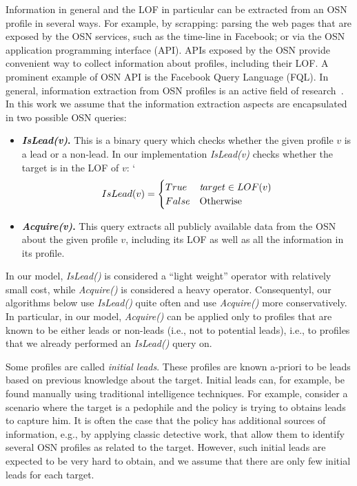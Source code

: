 \documentclass[prodmode,acmtecs]{acmsmall} %
\newcommand{\islead}[1]{{\em IsLead(#1)}}
\newcommand{\acquire}[1]{{\em Acquire(#1)}}
\newcommand{\target}{{\textit target}}
\begin{document}
Information in general and the LOF in particular can be extracted from an OSN profile in several ways. For example, by scrapping: parsing the web pages that are exposed by the OSN services, such as the time-line in Facebook; or via the OSN application programming interface (API). APIs exposed by the OSN provide convenient way to collect information about profiles, including their LOF. A prominent example of OSN API is the Facebook Query Language (FQL). 	
In general, information extraction from OSN profiles is an active field of research~\cite[inter alia]{tang2010aCombinationApproach,pawlas2012universal}.
In this work we assume that the information extraction aspects are encapsulated in two possible OSN queries: 
\begin{itemize}
\item {\bf \islead{v}.} This is a binary query which checks whether the given profile \(v\) is a lead or a non-lead. In our implementation \islead{v}  checks whether the target is in the LOF of $v$:
`
\begin{equation}
IsLead(v)=
\begin{cases} 
      True  & \target \in LOF(v) \\
      False & \text{Otherwise}
\end{cases}
\end{equation}
\item {\bf \acquire{v}.}  This query extracts all publicly available data from the OSN about the given profile \(v\), including its LOF as well as all the information in its profile.  
\end{itemize}

In our model, \islead{} is considered a ``light weight'' operator with relatively small cost, while \acquire{} is considered a heavy operator. 
Consequentyl, our algorithms below use \islead{} 
quite often and use \acquire{} more conservatively. In particular, in our model, \acquire{} can be applied only to profiles that are known to be either leads or non-leads (i.e., not to potential leads), i.e., to profiles that we already performed an \islead{} query on. 


Some profiles are called {\em initial leads}. These profiles are known a-priori to be leads based on previous knowledge about the target.  Initial leads can, for example, be found manually using traditional intelligence techniques. 
For example, consider a scenario where the target is a pedophile and the policy is trying to obtains leads to capture him. It is often the case that the policy has additional sources of information, e.g., by applying classic detective work, that allow them to identify several OSN profiles as related to the target. However, such initial leads are expected to be very hard to obtain, and we assume that there are only few initial leads for each target. 
\end{document}
